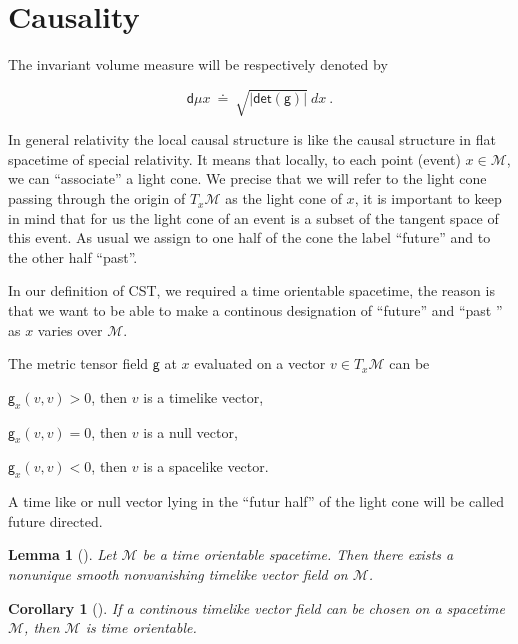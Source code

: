 \documentclass[10pt]{book}
\newcommand{\abs}[1]{\left|#1\right|}
\renewcommand{\det}{\mathsf{det}}
\newcommand{\Mcal}{\mathcal{M}}
\newcommand{\dsf}{\mathsf{d}}
\newcommand{\gsf}{\mathsf{g}}
\theoremstyle{break}
\newtheorem{lemma}{Lemma}
\newtheorem{corollary}{Corollary}
\begin{document}
\section{Causality}




The invariant volume measure will be respectively denoted by  

\begin{equation*} 
 \dsf\mu x \ \doteq \ \sqrt{\abs{\det(\gsf)}} \ dx \ .
\end{equation*}



In general relativity the local causal structure is like the causal structure in flat spacetime of special relativity. It means that locally, to each point (event) $x\in\Mcal$, we can ``associate'' a light cone. We precise that we will refer to the light cone passing through the origin of $T_x\Mcal$ as the light cone of $x$, it is important to keep in mind that for us the light cone of an event is a subset of the tangent space of this event.
As usual we assign to one half of the cone the label ``future'' and to the other half ``past''. \par

In our definition of CST, we required a time orientable spacetime, the reason is that we want to be able to make a continous designation of ``future'' and ``past '' as $x$ varies over $\Mcal$. \par

The metric tensor field $\gsf$ at $x$ evaluated on a vector $v \in T_x\Mcal$ can be
\begin{description}
 \item $\gsf_x(v,v) > 0$, then $v$ is a timelike vector,
 \item $\gsf_x(v,v) = 0$, then $v$ is a null vector,
 \item $\gsf_x(v,v) < 0$, then $v$ is a spacelike vector.
\end{description}
A time like or null vector lying in the ``futur half'' of the light cone will be called future directed.

\begin{lemma}[]
Let $\Mcal$ be a time orientable spacetime. Then there exists a nonunique smooth nonvanishing timelike vector field on $\Mcal$.
\end{lemma}

\begin{corollary}[]
If a continous timelike vector field can be chosen on a spacetime $\Mcal$, then $\Mcal$ is time orientable.
\end{corollary}
\end{document}
